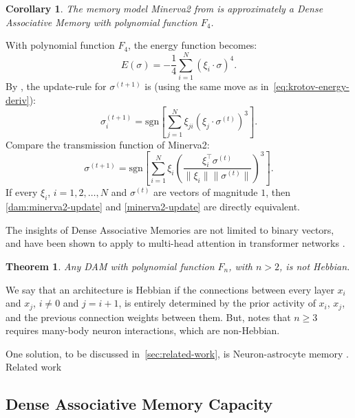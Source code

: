 \documentclass{article}
\newtheorem{theorem}{Theorem}[subsection]
\newtheorem{corollary}{Corollary}[subsection]
\theoremstyle{definition}
\begin{document}
\begin{corollary}
  The memory model \textsf{Minerva2} from
  \textcite{hintzman_minerva_1984} is approximately
  a Dense Associative Memory with polynomial function $F_4$.
\end{corollary}
\noindent
With polynomial function $F_4$, the energy function becomes:
\begin{equation}
  E(\sigma) = - \frac{1}{4} \sum^N_{i=1} (\xi_i \cdot \sigma)^4.
\end{equation}
By \textcite{krotov_modern_2025}, the update-rule for $\sigma^{(t+1)}$
is (using the same move as in~\autoref{eq:krotov-energy-deriv}):
\begin{equation}\label{dam:minerva2-update}
  \sigma^{(t+1)}_i = \text{sgn} \left[ \sum^N_{j=1} \xi_{ji} (\xi_j
  \cdot \sigma^{(t)})^3 \right].
\end{equation}
Compare the transmission function of \textsf{Minerva2}:
\begin{equation}\label{minerva2-update}
  \sigma^{(t+1)} = \text{sgn} \left[ \sum^N_{i=1} \xi_i
    \left(\frac{\xi_i^\top \sigma^{(t)}}{\|\xi_i\|
  \|\sigma^{(t)}\|}\right)^3 \right].
\end{equation}
If every $\xi_i$, $i=1, 2, \dots, N$ and $\sigma^{(t)}$ are vectors
of magnitude $1$,
then \autoref{dam:minerva2-update} and \autoref{minerva2-update}
are directly equivalent.

The insights of Dense Associative Memories are not limited to binary vectors,
and have been shown to apply to multi-head attention in transformer networks
\parencites{ramsauer_hopfield_2021,vaswani_attention_2023}.

\begin{theorem}
  Any DAM with polynomial function $F_n$, with $n > 2$, is not Hebbian.
\end{theorem}

We say that an architecture is Hebbian if the connections between
every layer $x_i$ and $x_j$, $i \neq 0$ and $j = i + 1$, is entirely
determined by the prior activity of $x_i$, $x_j$, and the
previous connection
weights between them. But, \textcite{krotov_large_2021} notes that
$n \geq 3$ requires many-body neuron interactions, which are non-Hebbian.

One solution, to be discussed in~\autoref{sec:related-work}, is Neuron-astrocyte
memory \parencite{kozachkov_neuron-astrocyte_2024}. Related work
\parencite{ramsauer_hopfield_2021}

\subsection{Dense Associative Memory Capacity}\label{sec:dam-cap}
\end{document}
